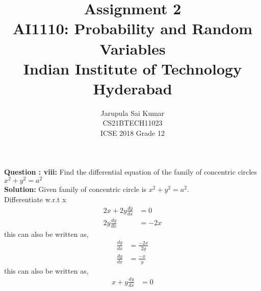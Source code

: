 \documentclass[journal,12pt,twocolumn]{IEEEtran}
\begin{document}
\graphicspath{{figures/}}

\title{Assignment 2 \\ \Large AI1110: Probability and Random Variables \\ \large Indian Institute of Technology Hyderabad}
\author{Jarupula Sai Kumar \\ \normalsize CS21BTECH11023  \\ \Large ICSE 2018 Grade 12}
\date{}
\maketitle
\begin{flushleft}
\textbf{Question : viii: }
Find the differential equation of the family of concentric circles $x^2+ y^2 = a^2$\\
\textbf{Solution: }Given family of concentric circle is $x^2+ y^2 = a^2$.\\
 Differentiate w.r.t x
\begin{align}
2x +2y\frac{dy}{dx} &= 0\\
2y\frac{dy}{dx} &=-2x
\end{align}
this can also be written as,
\begin{align}
\frac{dy}{dx} &=\frac{-2x}{2y}\\
\frac{dy}{dx} &=\frac{-x}{y}
\end{align}
this can also be written as,
\begin{align}
x+y\frac{dy}{dx} &=0
\end{align}
\end{flushleft}
\end{document}
